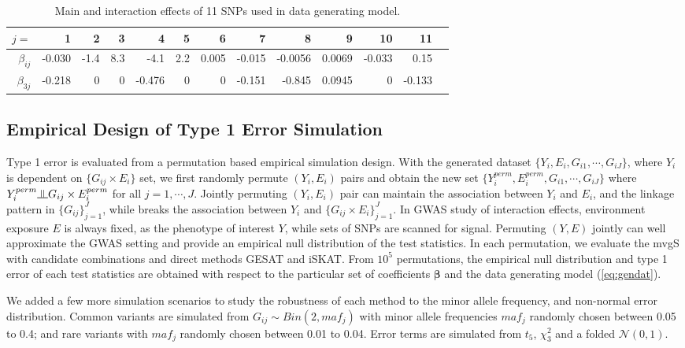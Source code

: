 \documentclass{article}
\newcommand{\indep}{\raisebox{0.05em}{\rotatebox[origin=c]{90}{$\models$}}}
\begin{document}
\begin{table}[htb!]
\centering 
\begin{tabular}{rrrrrrrrrrrrr}\hline
$j=$&1 & 2 & 3 & 4&5&6&7&8& 9&10&11\\
\hline
$\beta_{ij}$  & -0.030 & -1.4& 8.3 & -4.1& 2.2& 0.005& -0.015& -0.0056& 0.0069& -0.033& 0.15 \\
$\beta_{3j}$ & -0.218& 0& 0& -0.476& 0& 0& -0.151& -0.845& 0.0945& 0& -0.133  \\
\hline
\end{tabular}
\caption{Main and interaction effects of 11 SNPs used in data generating model.}
\label{tab:coef}
\end{table}

\subsection{Empirical Design of Type 1 Error Simulation}

 Type 1 error is evaluated from a permutation based empirical simulation design. With the generated dataset $\{Y_i, E_i, G_{i1}, \cdots, G_{iJ}\}$, where $Y_i$ is dependent on $\{G_{ij}\times E_i\}$ set, we first randomly permute $(Y_i, E_i)$ pairs and obtain the new set $\{Y_i^{perm}, E_i^{perm}, G_{i1},\cdots, G_{iJ}\}$ where $Y_i^{perm} \indep G_{ij}\times E_i^{perm}$ for all $j=1,\cdots,J$.  Jointly permuting $(Y_i, E_i)$ pair can maintain the association between $Y_i$ and $E_i$, and the linkage pattern in $\{G_{ij}\}_{j=1}^J$, while breaks the association between $Y_i$ and $\{G_{ij}\times E_i\}_{j=1}^J$. In GWAS study of interaction effects, environment exposure $E$ is always fixed, as the phenotype of interest $Y$, while sets of SNPs are scanned for signal. Permuting $(Y,E)$ jointly can well approximate the GWAS setting and provide an empirical null distribution of the test statistics. In each permutation, we evaluate the mvgS with candidate combinations and direct methods GESAT and iSKAT. From $10^5$ permutations, the empirical null distribution and type 1 error of each test statistics are obtained with respect to the particular set of coefficients $\mathbf{\beta}$ and the data generating model (\ref{eq:gendat}). 
 
 We added a few more simulation scenarios to study the robustness of each method to the minor allele frequency, and non-normal error distribution. Common variants are simulated from $G_{ij}\sim Bin(2, maf_j)$ with minor allele frequencies $maf_j$ randomly chosen between 0.05 to 0.4; and rare variants with $maf_j$ randomly chosen between 0.01 to 0.04. Error terms are simulated from $t_{5}$, $\chi^2_{3}$ and a folded $\mathcal{N}(0,1)$.
\end{document}
